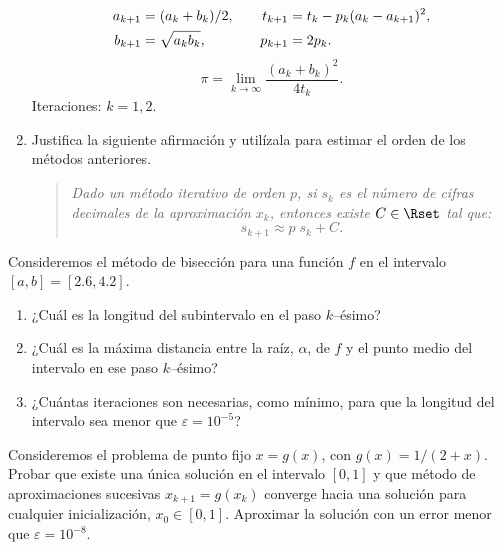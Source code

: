 \documentclass[11pt]{article}
\begin{document}
\begin{problemas}
\begin{problema}
\begin{enumerate}
\begin{align*}
      a_{k+1}&=(a_{k}+b_{k})/2 , &\quad
      t_{k+1}&=t_k - p_k(a_k -a_{k+1})^2, \\
      b_{k+1}& =\sqrt{a_{k}\*b_{k}}, &\quad p_{k+1}&=2p_k.
    \end{align*}
    $$
    \pi = \lim_{k\to\infty} \frac{(a_k+b_k)^2}{4t_k}.
    $$
    Iteraciones: $k=1,2$.
    \item
    Justifica la siguiente afirmación y utilízala para estimar el
    orden de los métodos anteriores.
    \begin{quotation}\it
      Dado un método iterativo de orden $p$, si $s_k$ es el
      número de cifras decimales de la aproximación $x_k$, entonces
      existe $C\in\Rset$ tal que:
      $$
      s_{k+1} \approx p \; s_k + C.
      $$
    \end{quotation}
    \end{enumerate}
  \end{problema}
  \begin{problema}
    Consideremos el método de bisección para
    una función $f$ en el intervalo $[a,b]=[2.6,4.2]$. 
    \begin{enumerate}
    \item ¿Cuál es la longitud del subintervalo en el paso $k$--ésimo?
    \item ¿Cuál es la máxima distancia entre la raíz, $\alpha$, de $f$
      y el punto medio del intervalo en ese paso $k$--ésimo?
    \item ¿Cuántas iteraciones son necesarias, como mínimo, para que
      la longitud del intervalo sea menor que $\varepsilon=10^{-5}$?
    \end{enumerate}
  \end{problema}
 
  \begin{problema}
    Consideremos el problema de punto fijo $x=g(x)$, con
    $g(x)=1/(2+x)$.  Probar que existe una única solución en el
    intervalo $[0,1]$ y que método de aproximaciones sucesivas
    $x_{k+1}=g(x_k)$ converge hacia una solución para cualquier
    inicialización, $x_0\in[0,1]$. Aproximar la
    solución con un error menor que $\varepsilon=10^{-8}$.
  \end{problema}
\end{problemas}
\end{document}
